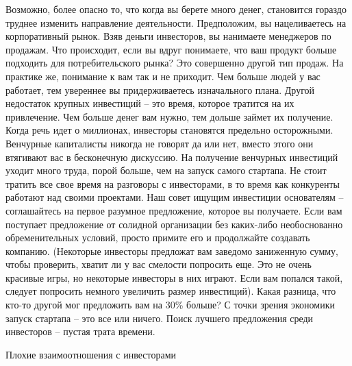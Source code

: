 \documentclass[ebook,12pt,oneside,openany]{memoir}
\begin{document}
Возможно, более опасно то, что когда вы берете много денег, становится
гораздо труднее изменить направление деятельности. Предположим, вы
нацеливаетесь на корпоративный рынок. Взяв деньги инвесторов, вы
нанимаете менеджеров по продажам. Что происходит, если вы вдруг
понимаете, что ваш продукт больше подходить для потребительского
рынка? Это совершенно другой тип продаж. На практике же, понимание к
вам так и не приходит. Чем больше людей у вас работает, тем увереннее
вы придерживаетесь изначального плана. Другой недостаток крупных
инвестиций – это время, которое тратится на их привлечение. Чем больше
денег вам нужно, тем дольше займет их получение. Когда речь идет о
миллионах, инвесторы становятся предельно осторожными. Венчурные
капиталисты никогда не говорят да или нет, вместо этого они втягивают
вас в бесконечную дискуссию. На получение венчурных инвестиций уходит
много труда, порой больше, чем на запуск самого стартапа. Не стоит
тратить все свое время на разговоры с инвесторами, в то время как
конкуренты работают над своими проектами. Наш совет ищущим инвестиции
основателям – соглашайтесь на первое разумное предложение, которое вы
получаете. Если вам поступает предложение от солидной организации без
каких-либо необоснованно обременительных условий, просто примите его и
продолжайте создавать компанию. (Некоторые инвесторы предложат вам
заведомо заниженную сумму, чтобы проверить, хватит ли у вас смелости
попросить еще. Это не очень красивые игры, но некоторые инвесторы в
них играют. Если вам попался такой, следует попросить немного
увеличить размер инвестиций). Какая разница, что кто-то другой мог
предложить вам на 30\% больше? С точки зрения экономики запуск
стартапа – это все или ничего. Поиск лучшего предложения среди
инвесторов – пустая трата времени.

Плохие взаимоотношения с инвесторами
\end{document}
